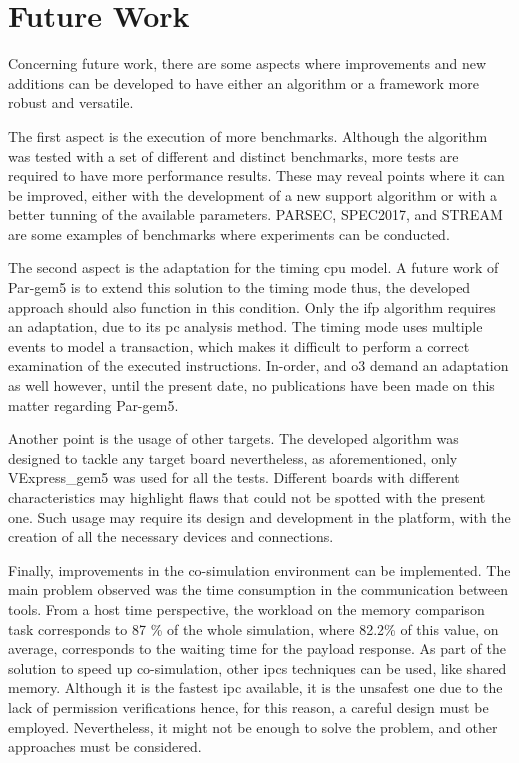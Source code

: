 \section{Future Work}

Concerning future work, there are some aspects where improvements and new additions can be developed to have either an 
algorithm or a framework more robust and versatile.

The first aspect is the execution of more benchmarks. Although the algorithm was tested with a set of different and distinct benchmarks, 
more tests are required to have more performance results. These may reveal points where it can be improved, either with the development
of a new support algorithm or with a better tunning of the available parameters. PARSEC, SPEC2017, and STREAM are some examples of 
benchmarks where experiments can be conducted. 

The second aspect is the adaptation for the timing \gls{cpu} model. A future work of Par-gem5 \cite{pargem5} is to extend this solution 
to the timing mode thus, the developed approach should also function in this condition. Only the \gls{ifp} algorithm requires an 
adaptation, due to its \gls{pc} analysis method. The timing mode uses multiple events to model a transaction, which makes it difficult
to perform a correct examination of the executed instructions. In-order, and \gls{o3} demand an adaptation as well however, until 
the present date, no publications have been made on this matter regarding Par-gem5.

Another point is the usage of other targets. The developed algorithm was designed to tackle any target board nevertheless, as 
aforementioned, only VExpress\_gem5 was used for all the tests. Different boards with different characteristics may highlight flaws
that could not be spotted with the present one. Such usage may require its design and development in the platform, 
with the creation of all the necessary devices and connections. 

Finally, improvements in the co-simulation environment can be implemented. The main problem observed was the time consumption in the 
communication between tools. From a host time perspective, the workload on the memory comparison task corresponds to 87 \% of the 
whole simulation, where 82.2\% of this value, on average, corresponds to the waiting time for the payload response. As part of the solution
to speed up co-simulation, other \glspl*{ipc} techniques can be used, like shared memory. Although it is the 
fastest \gls{ipc} available, it is the unsafest one due to the lack of permission verifications hence, for this reason, a careful 
design must be employed. Nevertheless, it might not be enough to solve the problem, and other approaches must be considered.
